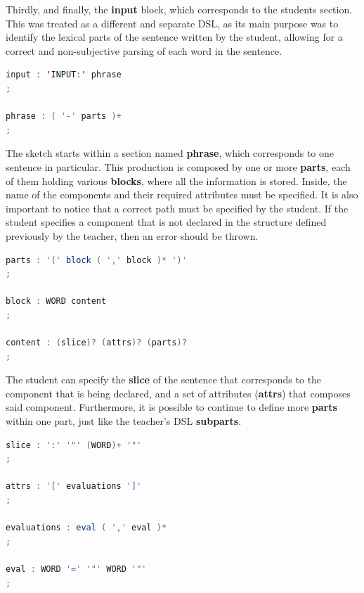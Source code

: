 Thirdly, and finally, the \textbf{input} block, which corresponds to the students section. This was treated as a different and separate \textsc{DSL}, as its main purpose was to identify the lexical parts of the sentence written 
by the student, allowing for a correct and non-subjective parsing of each word in the sentence.

\begin{center}
\begin{minipage}{6cm}
\begin{lstlisting}[language=java, basicstyle=\small, label={lst:dsl_input_prod}, caption=DSL input production]
input : 'INPUT:' phrase 
;

phrase : ( '-' parts )+
;
\end{lstlisting}
\end{minipage}
\end{center}

The sketch starts within a section named \textbf{phrase}, which corresponds to one sentence in particular. 
This production is composed by one or more \textbf{parts}, each of them holding various \textbf{blocks}, where all the information is stored. 
Inside, the name of the components and their required attributes must be specified. 
It is also important to notice that a correct path must be specified by the student. 
If the student specifies a component that is not declared in the structure defined previously by the teacher, then an error should be thrown.

\begin{center}
\begin{minipage}{9cm}
\begin{lstlisting}[language=java, basicstyle=\small, label={lst:dsl_parts_prod}, caption=DSL parts/component/content productions]
parts : '(' block ( ',' block )* ')'
;

block : WORD content
;

content : (slice)? (attrs)? (parts)?
;
\end{lstlisting}
\end{minipage}
\end{center}

The student can specify the \textbf{slice} of the sentence that corresponds to the component that is being declared, and a set of attributes (\textbf{attrs}) that composes said component. Furthermore, it is possible to continue to define more \textbf{parts} within one part, just like the teacher's \textsc{DSL} \textbf{subparts}.

\begin{center}
\begin{minipage}{8cm}
\begin{lstlisting}[language=java, basicstyle=\small, label={lst:dsl_slice_prod},
caption=DSL slice/attrs/evaluations/eval productions]
slice : ':' '"' (WORD)+ '"'
;

attrs : '[' evaluations ']'
;

evaluations : eval ( ',' eval )*
;

eval : WORD '=' '"' WORD '"'
;
\end{lstlisting}
\end{minipage}
\end{center}

